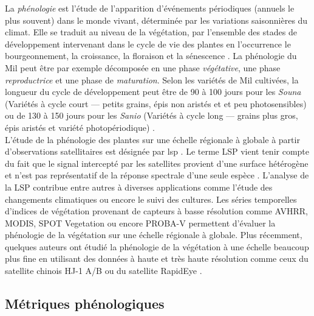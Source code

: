 La \emph{phénologie} 
est l’étude de l’apparition d’événements périodiques (annuels le plus souvent) dans le monde vivant, déterminée par les variations saisonnières du climat. Elle se traduit au niveau de 
la végétation, par l’ensemble des stades de développement intervenant dans le cycle de vie des plantes en l’occurrence le bourgeonnement, la croissance, la floraison et la 
sénescence \citep{Kimball2014}. La phénologie du Mil peut être par exemple décomposée en une phase \emph{végétative}, une phase \emph{reproductrice} et une phase de 
\emph{maturation}. Selon les variétés de Mil cultivées, la longueur du cycle de développement peut être de 90 à 100 jours pour les \emph{Souna} (Variétés à cycle court --- 
petits grains, épis non aristés et et peu photosensibles) ou de 130 à 150 jours pour les \emph{Sanio} (Variétés à cycle long --- grains plus gros, épis aristés et variété photopériodique) \citep{Diouf2001}.
\\L'\'etude de la phénologie des plantes sur une échelle régionale à globale à partir d’observations satellitaires est désignée par \acrfull{lsp} \citep{Helman2018}. Le terme LSP 
vient tenir compte du fait que le signal intercepté par les satellites provient d’une surface hétérogène et n’est pas représentatif de la réponse spectrale d’une seule espèce 
\citep{Kimball2014}. L'analyse de la LSP contribue entre autres à diverses applications comme l’étude des changements climatiques \citep{Begue2014} ou encore le suivi des
cultures. Les séries temporelles d’indices de végétation provenant de capteurs à basse résolution comme AVHRR, MODIS, SPOT Vegetation ou encore PROBA-V permettent d’évaluer 
la phénologie de la végétation sur une échelle régionale à globale. Plus récemment, quelques auteurs ont étudié la phénologie de la végétation à une échelle beaucoup plus fine en utilisant des données
à haute et très haute résolution comme ceux du satellite chinois HJ-1 A/B \citep{Pan2015} ou du satellite RapidEye \citep{Vrieling2017}.

  \subsection{Métriques phénologiques}


